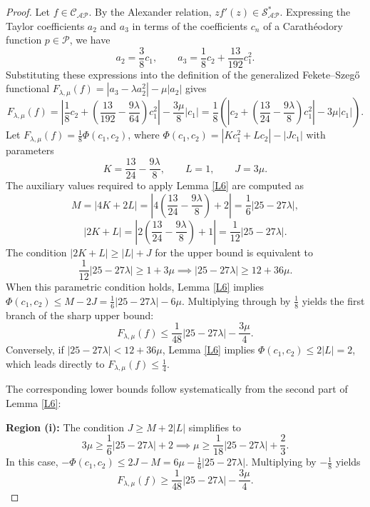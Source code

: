 \documentclass[10pt,a4paper]{amsart}
\numberwithin{equation}{section}
\begin{document}
\begin{proof}
Let $f \in \mathcal{C}_{\mathcal{AP}}$. By the Alexander relation, $zf'(z) \in \mathcal{S}_{\mathcal{AP}}^{*}$. Expressing the Taylor coefficients $a_2$ and $a_3$ in terms of the coefficients $c_n$ of a Carath\'{e}odory function $p \in \mathcal{P}$, we have
\begin{equation}\label{po16}
a_2 = \frac{3}{8} c_1, \qquad a_3 = \frac{1}{8} c_2 + \frac{13}{192}c_1^2.
\end{equation}
Substituting these expressions into the definition of the generalized Fekete--Szeg\H{o} functional $F_{\lambda,\mu}(f) = |a_3 - \lambda a_2^2| - \mu |a_2|$ gives
\begin{equation}\label{eq:FeketeSzegoExpanded}
F_{\lambda,\mu}(f) = \left| \frac{1}{8} c_2 + \left( \frac{13}{192} - \frac{9\lambda}{64} \right)c_1^2 \right| - \frac{3\mu}{8}|c_1| = \frac{1}{8} \left( \left| c_2 + \left( \frac{13}{24} - \frac{9\lambda}{8} \right)c_1^2 \right| - 3\mu |c_1| \right).
\end{equation}
Let $F_{\lambda,\mu}(f) = \frac{1}{8} \Phi(c_1,c_2)$, where $\Phi(c_1,c_2) = |Kc_1^2 + Lc_2| - |Jc_1|$ with parameters
\[
K = \frac{13}{24} - \frac{9\lambda}{8}, \qquad L = 1, \qquad J = 3\mu.
\]
The auxiliary values required to apply Lemma \ref{L6} are computed as
\[
M = |4K+2L| = \left| 4\left(\frac{13}{24} - \frac{9\lambda}{8}\right) + 2 \right| = \frac{1}{6} |25-27\lambda|,
\]
\[
|2K+L| = \left| 2\left(\frac{13}{24} - \frac{9\lambda}{8}\right) + 1 \right| = \frac{1}{12} |25-27\lambda|.
\]
The condition $|2K+L| \ge |L|+J$ for the upper bound is equivalent to
\[
\frac{1}{12}|25-27\lambda| \ge 1 + 3\mu \implies |25-27\lambda| \ge 12 + 36\mu.
\]
When this parametric condition holds, Lemma \ref{L6} implies $\Phi(c_1,c_2) \le M-2J = \frac{1}{6}|25-27\lambda|-6\mu$. Multiplying through by $\frac{1}{8}$ yields the first branch of the sharp upper bound:
\[
F_{\lambda,\mu}(f) \le \frac{1}{48} |25 - 27\lambda| - \frac{3\mu}{4}.
\]
Conversely, if $|25-27\lambda| < 12 + 36\mu$, Lemma \ref{L6} implies $\Phi(c_1,c_2) \le 2|L| = 2$, which leads directly to $F_{\lambda,\mu}(f) \le \frac{1}{4}$.

The corresponding lower bounds follow systematically from the second part of Lemma \ref{L6}:

\medskip
\noindent\textbf{Region (i):} The condition $J \ge M+2|L|$ simplifies to
\[
3\mu \ge \frac{1}{6}|25-27\lambda| + 2 \implies \mu \ge \frac{1}{18} |25 - 27\lambda| + \frac{2}{3}.
\]
In this case, $-\Phi(c_1,c_2) \le 2J-M = 6\mu - \frac{1}{6}|25-27\lambda|$. Multiplying by $-\frac{1}{8}$ yields
\[
F_{\lambda,\mu}(f) \ge \frac{1}{48} |25 - 27\lambda| - \frac{3\mu}{4}.
\]


\end{proof}
\end{document}
